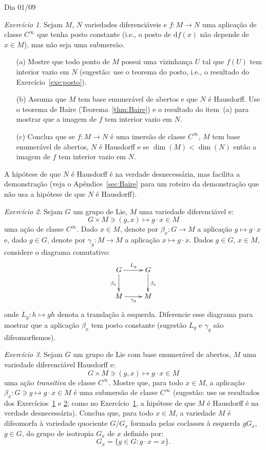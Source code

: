 \documentclass[oneside,11pt]{amsart}
\newcommand{\dd}{\mathrm d}
\DeclareMathOperator{\Dim}{dim}
\theoremstyle{remark}\newtheorem{exercise}{Exercício}[section]
\theoremstyle{plain}\newtheorem{teo}{Teorema}[section]
\theoremstyle{plain}\newtheorem{lem}[teo]{Lema}
\theoremstyle{plain}\newtheorem{prop}[teo]{Proposição}
\theoremstyle{definition}\newtheorem{defin}[teo]{Definição}
\theoremstyle{remark}\newtheorem{rem}[teo]{Observação}
\theoremstyle{definition}\newtheorem{example}[teo]{Exemplo}
\numberwithin{equation}{section}
\begin{document}
\begin{section}{Dia 01/09}
\begin{exercise}\label{exe:naosubnaosobre}
Sejam $M$, $N$ variedades diferenciáveis e $f:M\to N$ uma aplicação de classe $C^\infty$ que tenha posto constante
(i.e., o posto de $\dd f(x)$ não depende de $x\in M$), mas não seja uma submersão.
\begin{itemize}
\item[(a)] Mostre que todo ponto de $M$ possui uma vizinhança $U$ tal que $f(U)$ tem interior vazio em $N$
(sugestão: use o teorema do posto, i.e., o resultado do Exercício~\ref{exe:posto}).
\item[(b)] Assuma que $M$ tem base enumerável de abertos e que $N$ é Hausdorff. Use o teorema de Baire (Teorema~\ref{thm:Baire}) e o resultado
do item~(a) para mostrar que a imagem de $f$ tem interior vazio em $N$.
\item[(c)] Conclua que se $f:M\to N$ é uma imersão de classe $C^\infty$, $M$ tem base enumerável
de abertos, $N$ é Hausdorff e se $\Dim(M)<\Dim(N)$ então a imagem de $f$ tem interior vazio em $N$.
\end{itemize}
A hipótese de que $N$ é Hausdorff é na verdade desnecessária, mas facilita a demonstração (veja o Apêndice~\ref{sec:Baire} para um roteiro
da demonstração que não usa a hipótese de que $N$ é Hausdorff).
\end{exercise}

\begin{exercise}\label{exe:betacterk}
Sejam $G$ um grupo de Lie, $M$ uma variedade diferenciável e:
\[G\times M\ni(g,x)\longmapsto g\cdot x\in M\]
uma ação de classe $C^\infty$. Dado $x\in M$, denote por $\beta_x:G\to M$ a aplicação $g\mapsto g\cdot x$
e, dado $g\in G$, denote por $\gamma_g:M\to M$ a aplicação $x\mapsto g\cdot x$. Dados $g\in G$, $x\in M$, considere
o diagrama comutativo:
\[\xymatrix{%
G\ar[r]^{L_g}\ar[d]_{\beta_x}&G\ar[d]^{\beta_x}\\
M\ar[r]_{\gamma_g}&M}\]
onde $L_g:h\mapsto gh$ denota a translação à esquerda.
Diferencie esse diagrama para mostrar que a aplicação $\beta_x$ tem posto constante (sugestão $L_g$ e $\gamma_g$
são difeomorfismos).
\end{exercise}

\begin{exercise}\label{exe:betaxsubmers}
Sejam $G$ um grupo de Lie com base enumerável de abertos, $M$ uma variedade diferenciável Hausdorff e:
\[G\times M\ni(g,x)\longmapsto g\cdot x\in M\]
uma ação {\em transitiva\/} de classe $C^\infty$. Mostre que, para todo $x\in M$, a aplicação $\beta_x:G\ni g\mapsto g\cdot x\in M$
é uma submersão de classe $C^\infty$ (sugestão: use os resultados dos Exercícios~\ref{exe:naosubnaosobre} e \ref{exe:betacterk};
como no Exercício~\ref{exe:naosubnaosobre}, a hipótese de que $M$ é Hausdorff é na verdade desnecessária). Conclua
que, para todo $x\in M$, a variedade $M$ é difeomorfa à variedade quociente $G/G_x$ formada pelas coclasses à esquerda $gG_x$, $g\in G$, do
grupo de isotropia $G_x$ de $x$ definido por:
\[G_x=\big\{g\in G:g\cdot x=x\big\}.\]
\end{exercise}


\end{section}
\end{document}
